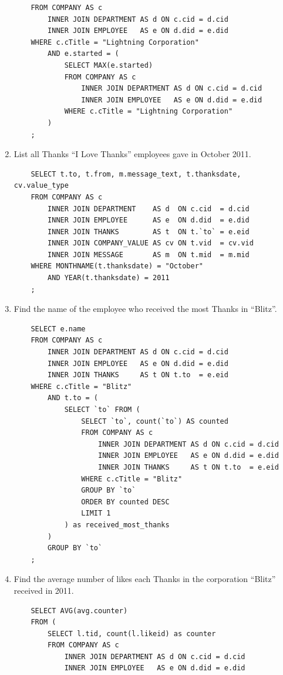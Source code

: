 \documentclass[11pt]{report}
\begin{document}
\begin{enumerate}
\begin{verbatim}
    FROM COMPANY AS c
        INNER JOIN DEPARTMENT AS d ON c.cid = d.cid
        INNER JOIN EMPLOYEE   AS e ON d.did = e.did
    WHERE c.cTitle = "Lightning Corporation"
        AND e.started = (
            SELECT MAX(e.started)
            FROM COMPANY AS c
                INNER JOIN DEPARTMENT AS d ON c.cid = d.cid
                INNER JOIN EMPLOYEE   AS e ON d.did = e.did
            WHERE c.cTitle = "Lightning Corporation"
        )
    ;
    \end{verbatim}
    \item List all Thanks ``I Love Thanks'' employees gave in October 2011.
    \begin{verbatim}
    SELECT t.to, t.from, m.message_text, t.thanksdate, cv.value_type
    FROM COMPANY AS c
        INNER JOIN DEPARTMENT    AS d  ON c.cid  = d.cid
        INNER JOIN EMPLOYEE      AS e  ON d.did  = e.did
        INNER JOIN THANKS        AS t  ON t.`to` = e.eid
        INNER JOIN COMPANY_VALUE AS cv ON t.vid  = cv.vid
        INNER JOIN MESSAGE       AS m  ON t.mid  = m.mid
    WHERE MONTHNAME(t.thanksdate) = "October"
        AND YEAR(t.thanksdate) = 2011
    ;
    \end{verbatim}
    \item Find the name of the employee who received the most Thanks in ``Blitz''.
    \begin{verbatim}
    SELECT e.name
    FROM COMPANY AS c
        INNER JOIN DEPARTMENT AS d ON c.cid = d.cid
        INNER JOIN EMPLOYEE   AS e ON d.did = e.did
        INNER JOIN THANKS     AS t ON t.to  = e.eid
    WHERE c.cTitle = "Blitz"
        AND t.to = (
            SELECT `to` FROM (
                SELECT `to`, count(`to`) AS counted
                FROM COMPANY AS c
                    INNER JOIN DEPARTMENT AS d ON c.cid = d.cid
                    INNER JOIN EMPLOYEE   AS e ON d.did = e.did
                    INNER JOIN THANKS     AS t ON t.to  = e.eid
                WHERE c.cTitle = "Blitz"
                GROUP BY `to`
                ORDER BY counted DESC
                LIMIT 1
            ) as received_most_thanks
        )
        GROUP BY `to`
    ;
    \end{verbatim}
    \item Find the average number of likes each Thanks in the corporation ``Blitz'' received in 2011.
    \begin{verbatim}
    SELECT AVG(avg.counter)
    FROM (
        SELECT l.tid, count(l.likeid) as counter
        FROM COMPANY AS c
            INNER JOIN DEPARTMENT AS d ON c.cid = d.cid
            INNER JOIN EMPLOYEE   AS e ON d.did = e.did

\end{verbatim}
\end{enumerate}
\end{document}
